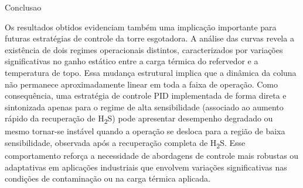 Conclusao



Os resultados obtidos evidenciam também uma implicação importante para futuras estratégias de controle da torre esgotadora. A análise das curvas revela a existência de dois regimes operacionais distintos, caracterizados por variações significativas no ganho estático entre a carga térmica do refervedor e a temperatura de topo. Essa mudança estrutural implica que a dinâmica da coluna não permanece aproximadamente linear em toda a faixa de operação. Como consequência, uma estratégia de controle PID implementada de forma direta e sintonizada apenas para o regime de alta sensibilidade (associado ao aumento rápido da recuperação de H\textsubscript{2}S) pode apresentar desempenho degradado ou mesmo tornar-se instável quando a operação se desloca para a região de baixa sensibilidade, observada após a recuperação completa de H\textsubscript{2}S. Esse comportamento reforça a necessidade de abordagens de controle mais robustas ou adaptativas em aplicações industriais que envolvem variações significativas nas condições de contaminação ou na carga térmica aplicada.
